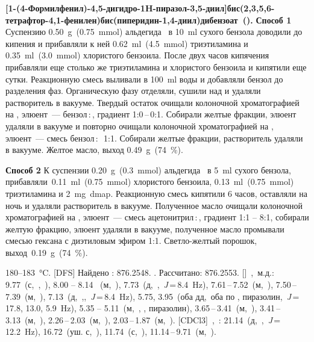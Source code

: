 \textbf{{[1-(4-Формилфенил)-4,5-дигидро-1H-пиразол-3,5-диил]бис(2,3,5,6-тетрафтор-4,1-фенилен)}бис(пиперидин-1,4-диил)дибензоат~().} \textbf{Способ 1} Суспензию \SI{0.50}{\gram}~(\SI{0.75}{\mmol}) альдегида~\textbf{} в \SI{10}{\milli\litre} сухого бензола доводили до кипения и прибавляли к ней \SI{0.62}{\milli\litre}~(\SI{4.5}{\mmol}) триэтиламина и \SI{0.35}{\milli\litre}~(\SI{3.0}{\mmol}) хлористого бензоила. После двух часов кипячения прибавляли еще столько же триэтиламина и хлористого бензоила и кипятили еще сутки. Реакционную смесь выливали в \SI{100}{\milli\litre} воды и добавляли бензол до разделения фаз. Органическую фазу отделяли, сушили над  и удаляли растворитель в вакууме. Твердый остаток очищали колоночной хроматографией на , элюент~--- бензол\,:\,, градиент 1:0\,--\,0:1. Собирали желтые фракции, элюент удаляли в вакууме и повторно очищали колоночной хроматографией на , элюент~--- смесь бензол\,:\,~1:1. Собирали желтые фракции, растворитель удаляли в вакууме. Желтое масло, выход \SI{0.49}{\gram}~(\SI{74}{\percent}).

\textbf{Способ 2} К суспензии \SI{0.20}{\gram}~(\SI{0.3}{\mmol}) альдегида~\textbf{} в \SI{5}{\milli\litre} сухого бензола, прибавляли~\SI{0.11}{\milli\litre}~(\SI{0.75}{\mmol}) хлористого бензоила, \SI{0.13}{\milli\litre}~(\SI{0.75}{\mmol}) триэтиламина и \SI{2}{\milli\gram}~\ac{dmap}.
Реакционную смесь кипятили 6 часов, оставляли на ночь и удаляли растворитель в вакууме.
Полученное масло очищали колоночной хроматографией на , элюент~--- смесь ацетонитрил\,:\,, градиент 1:1 -- 8:1, собирали желтую фракцию, элюент удаляли в вакууме, полученное масло промывали смесью гексана с диэтиловым эфиром 1:1. Светло-желтый порошок, выход~\SI{0.19}{\gram}~(\SI{74}{\percent}).
\begin{experimental}
     180--\SI{183}{\celsius}.
    [DFS] Найдено \ce{[M+]}: \num{876.2548}. . Рассчитано:  \num{876.2553}.
    []~\chemdelta,~м.д.: 9.77~(с,~,~), 8.00 -- 8.14 ~(м,~), 7.73~(д,~,~\textit{J}\,=\,8.4~\si{\hertz}), 7.61\,--\,7.52~(м,~), 7.50\,--\,7.39~(м,~), 7.13~(д,~,,~\textit{J}\,=\,8.4~\si{\hertz}), 5.75, 3.95~(оба дд,~оба по , пиразолин,~\textit{J}\,=\,17.8, 13.0, 5.9~\si{\hertz}), 5.35 -- 5.11~(м,~, , пиразолин), 3.65\,--\,3.41~(м,~), 3.41\,--\,3.13~(м,~), 2.26\,--\,2.03~(м,~), 2.03\,--\,1.87~(м,~).
    [CDCl3]~\chemdelta,~\si{\ppm}: 21.14~(д,~,~\textit{J}\,=\,12.2~\si{\hertz}), 16.72~(уш. с,~), 11.74~(с,~), 11.14\,--\,9.71~(м,~).
\end{experimental}

